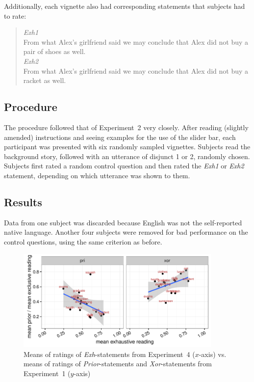 \documentclass[12pt]{article}
\begin{document}
\noindent Additionally, each vignette also had corresponding statements that subjects had to
rate:

\begin{quote}
  \emph{Exh1}\\
  From what Alex's girlfriend said we may conclude that Alex did not buy a pair of shoes as well. \\[.2cm]
  \emph{Exh2}\\
  From what Alex's girlfriend said we may conclude that Alex did not buy a racket as well.
\end{quote}

\subsection{Procedure}

The procedure followed that of Experiment~2 very closely. After reading (slightly amended)
instructions and seeing examples for the use of the slider bar, each participant was presented
with six randomly sampled vignettes. Subjects read the background story, followed with an
utterance of disjunct 1 or 2, randomly chosen. Subjects first rated a random control question
and then rated the \emph{Exh1} or \emph{Exh2} statement, depending on which utterance was shown
to them.

\subsection{Results}

Data from one subject was discarded because English was not the self-reported native
language. Another four subjects were removed for bad performance on the control questions,
using the same criterion as before.

\begin{figure}
  \centering
  \includegraphics[width=0.9\textwidth]{pics/correlationExhXorPri.pdf}
  \caption{Means of ratings of \emph{Exh}-statements from Experiment~4 ($x$-axis) vs. means of
    ratings of \emph{Prior}-statements and \emph{Xor}-statements from
    Experiment~1 ($y$-axis)}
\label{fig:CorrelationExp1Exp4}
\end{figure}
\end{document}
